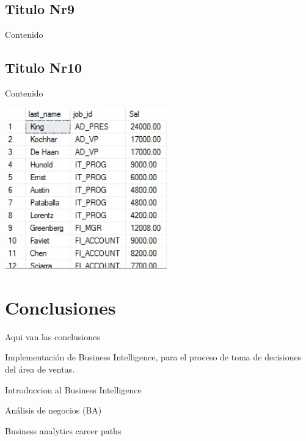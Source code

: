 \documentclass[twoside,twocolumn]{article}
\begin{document}
\subsection{Titulo Nr9}
Contenido 



\subsection{Titulo Nr10}
Contenido 

\begin{center}
	\includegraphics[width=7cm]{./Imagenes/img} 
\end{center}


\section{Conclusiones}

Aqui van las conclusiones



\begin{thebibliography}{99} 

\newblock Implementación de Business Intelligence, para el proceso de toma de decisiones del área de ventas.

\newblock Introduccion al Business Intelligence

\newblock Análisis de negocios (BA)

\newblock Business analytics career paths
 

 
\end{thebibliography}

\end{document}
